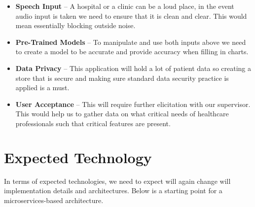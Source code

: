 \documentclass{article}
\begin{document}
\begin{itemize}
  \item \textbf{Speech Input} -- A hospital or a clinic can be a loud place, in the event audio input is taken we need to ensure that it is clean and clear. This would mean essentially blocking outside noise. 
  \item \textbf{Pre-Trained Models} -- To manipulate and use both inputs above we need to create a model to be accurate and provide accuracy when filling in charts. 
  \item \textbf{Data Privacy} -- This application will hold a lot of patient data so creating a store that is secure and making sure standard data security practice is applied is a must.
  \item \textbf{User Acceptance} -- This will require further elicitation with our supervisor. This would help us to gather data on what critical needs of healthcare professionals such that critical features are present. 
\end{itemize}

\section{Expected Technology}

In terms of expected technologies, we need to expect will again change will implementation details and architectures. Below is a starting point for a microservices-based architecture.
\end{document}
